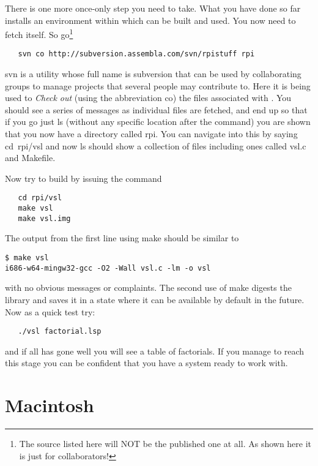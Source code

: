 There is one more once-only step you need to take. What you have done so far
installs an environment within which \vsl{} can be built and used. You now
need to fetch \vsl{} itself. So go\footnote{The source listed here will
NOT be the published one at all. As shown here it is just for
collaborators!}
{\small\begin{verbatim}
   svn co http://subversion.assembla.com/svn/rpistuff rpi
\end{verbatim}}
{\tx svn} is a utility whose full name is {\tx subversion} that can be
used by collaborating groups to manage projects that several people may
contribute to. Here it is being used to {\em Check out} (using the
abbreviation {\tx co}) the files associated with \vsl. You should see
a series of messages as individual files are fetched, and end up
so that if you go just {\tx ls} (without any specific location after the
command) you are shown that you now have a directory called {\tx rpi}.
You can navigate into this by saying {\tx cd~rpi/vsl} and now {\tx ls}
should show a collection of files including ones called
{\tx vsl.c} and {\tx Makefile}.

Now try to build \vsl{} by issuing the command
{\small\begin{verbatim}
   cd rpi/vsl
   make vsl
   make vsl.img
\end{verbatim}}
The output from the first line using {\tx make} should be similar to
{\small\begin{verbatim}
$ make vsl
i686-w64-mingw32-gcc -O2 -Wall vsl.c -lm -o vsl
\end{verbatim}}
with no obvious messages or complaints. The second use of {\tx make}
digests the \vsl{} library and saves it in a state where it can be available
by default in the future. Now as a quick test try:
{\small\begin{verbatim}
   ./vsl factorial.lsp
\end{verbatim}}
and if all has gone well you will see a table of factorials. If you manage
to reach this stage you can be confident that you have a system ready
to work with.

\section{Macintosh}





